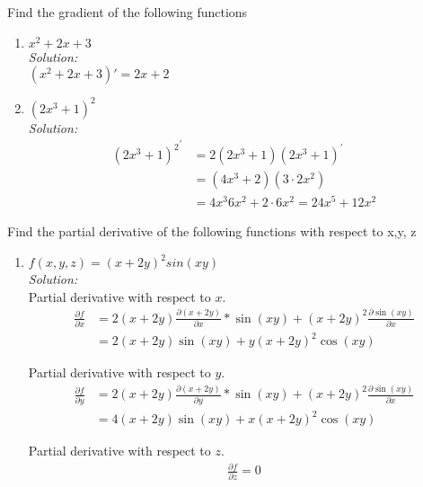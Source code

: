 \documentclass{../amsml}
\begin{document}
\begin{problem}
Find the gradient of the following functions
 
\begin{enumerate}
	\item $x^2 + 2x +3$ \\
		\emph{Solution: }  \\
			$(x^2 + 2x + 3){'} = 2x +2$ 
	\item $(2x^3 + 1)^2$ \\
		\emph{Solution: }  \\
			\begin{equation} 
				\begin{split}
					{(2x^3+1)^2}^{'} & = 2(2x^3+1)(2x^3+1)^{'}  \\ 
					& = (4x^3 + 2)(3 \cdot 2 x^2) \\ 
					& = 4x^3 6x^2 + 2 \cdot 6x^2 = 24 x^5 + 12 x^2 
				\end{split}
			\end{equation} 

\end{enumerate}

Find the partial derivative of the following functions with respect to x,y, z

\begin{enumerate}
	\item $f(x,y,z) = (x+2y)^2 sin(xy)$ \\
		\emph{Solution: }  \\
			Partial derivative with respect to $x$. \\
			\begin{align}
				\frac{\partial f}{\partial x} &= 2(x + 2y) \frac{\partial(x + 2y)}{\partial x}*\sin(xy) + (x + 2y)^2 \frac{\partial \sin(xy)}{\partial x}\\
				&= 2(x + 2y)\sin(xy) + y(x + 2y)^2 \cos(xy)
			\end{align}
			
			Partial derivative with respect to $y$.
			\begin{align}
				\frac{\partial f}{\partial y} &= 2(x + 2y) \frac{\partial(x + 2y)}{\partial y}*\sin(xy) + (x + 2y)^2 \frac{\partial \sin(xy)}{\partial x}\\
				&= 4(x + 2y)\sin(xy) + x(x + 2y)^2 \cos(xy)
			\end{align}
			
			Partial derivative with respect to $z$. \\
			\begin{align}
				\frac{\partial f}{\partial z } = 0
			\end{align}
			

\end{enumerate}
\end{problem}
\end{document}
